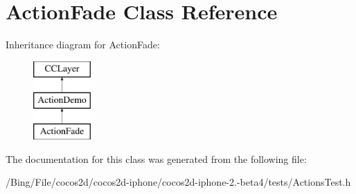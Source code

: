 \hypertarget{interface_action_fade}{\section{Action\-Fade Class Reference}
\label{interface_action_fade}
}
Inheritance diagram for Action\-Fade\-:\begin{figure}[H]
\begin{center}
\leavevmode
\includegraphics[height=3.000000cm]{interface_action_fade}
\end{center}
\end{figure}


The documentation for this class was generated from the following file\-:\begin{DoxyCompactItemize}
\item 
/\-Bing/\-File/cocos2d/cocos2d-\/iphone/cocos2d-\/iphone-\/2.-\/beta4/tests/Actions\-Test.\-h\end{DoxyCompactItemize}
